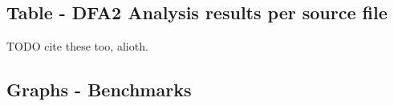 \subsection{Table - DFA2 Analysis results per source file}
TODO cite these too, alioth.

\newpage
%
\subsection{Graphs - Benchmarks}
\begin{center}

\end{center}
